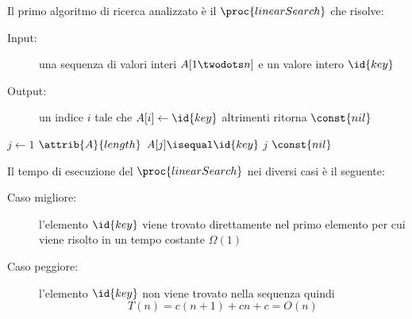 Il primo algoritmo di ricerca analizzato è il $\proc{linearSearch}$ che risolve:\newline
\begin{description}
  \item[Input:] una sequenza di valori interi $A[1 \twodots n]$ e un valore intero $\id{key}$
  \item[Output:] un indice $i$ tale che $A[i] \gets \id{key}$ altrimenti ritorna $\const{nil}$
\end{description}

\begin{codebox}
\li \For $j \gets 1$ \To $\attrib{A}{length}$
    \Do
\li               \If $A[j] \isequal \id{key}$
                  \Then
\li                         \Return $j$
                  \End
    \End
\li \Return $\const{nil}$
\end{codebox}
Il tempo di esecuzione del $\proc{linearSearch}$ nei diversi casi è il seguente:
\begin{description}
  \item[Caso migliore:] l'elemento $\id{key}$ viene trovato direttamente nel primo elemento
        per cui viene risolto in un tempo costante $\Omega(1)$
  \item[Caso peggiore:] l'elemento $\id{key}$ non viene trovato nella sequenza quindi
        \begin{equation*}
           T(n) = c(n+1) + cn + c = O(n)
        \end{equation*}
\end{description}
